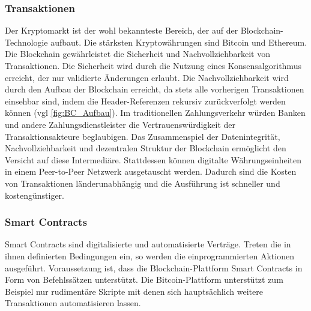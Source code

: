 \subsubsection{Transaktionen}
Der Kryptomarkt ist der wohl bekannteste Bereich, der auf der Blockchain-Technologie aufbaut.
Die stärksten Kryptowährungen sind Bitcoin und Ethereum. 
Die Blockchain gewährleistet die Sicherheit und Nachvollziehbarkeit von Transaktionen. 
\cite[p.~168]{chowdhary2025smart}
Die Sicherheit wird durch die Nutzung eines Konsensalgorithmus erreicht, der nur validierte 
Änderungen erlaubt. Die Nachvollziehbarkeit wird  durch den Aufbau der Blockchain erreicht, da stets 
alle vorherigen Transaktionen einsehbar sind, indem die Header-Referenzen rekursiv zurückverfolgt
werden können (vgl \autoref{fig:BC_Aufbau}).
Im traditionellen Zahlungsverkehr würden Banken und andere Zahlungsdienstleister die 
Vertrauenswürdigkeit der Transaktionsakteure beglaubigen.
Das Zusammenspiel der Datenintegrität, Nachvollziehbarkeit und dezentralen Struktur der
Blockchain ermöglicht den Versicht auf diese Intermediäre. Stattdessen können digitalte 
Währungseinheiten in einem Peer-to-Peer Netzwerk ausgetauscht werden.
\cite[p.~32]{fill2020blockchain}
Dadurch sind die Kosten von Transaktionen länderunabhängig \cite[p.~12]{pirafelnerblockchaintechnologie}
und die Ausführung ist schneller 
und kostengünstiger. \cite[p.~168]{chowdhary2025smart}


\subsubsection{Smart Contracts}
\label{sec:SmartContracts}
Smart Contracts sind digitalisierte und automatisierte Verträge.
\cite[p.~14]{pirafelnerblockchaintechnologie}
Treten die in ihnen definierten Bedingungen ein, so werden die einprogrammierten Aktionen
ausgeführt.
\cite[p.~55f]{fill2020blockchain}
Voraussetzung ist, dass die Blockchain-Plattform Smart Contracts in Form von 
Befehlssätzen unterstützt. Die Bitcoin-Plattform unterstützt zum Beispiel nur rudimentäre
Skripte mit denen sich hauptsächlich weitere Transaktionen automatisieren lassen. 

